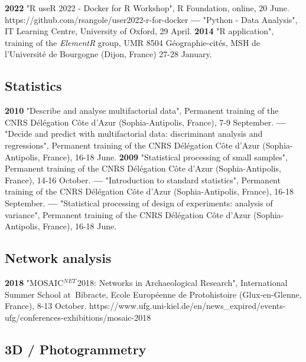\documentclass{article}
\begin{document}
\textbf{2022 }"\textsf{R} useR 2022 - Docker for R Workshop", R Foundation, online, 20 June. https://github.com/rsangole/user2022-r-for-docker
\smallbreak
\textbf{--- }"\textsf{Python} - Data Analysis", IT Learning Centre, University of Oxford, 29 April.
\smallbreak
\textbf{2014 }"\textsf{R} application", training of the \textit{ElementR} group, UMR 8504 G\'{e}ographie-cit\'{e}s, MSH de l'Universit\'{e} de Bourgogne (Dijon, France) 27-28 January.
\smallbreak

\subsection*{Statistics }

\textbf{2010 }"Describe and analyse multifactorial data", Permanent training of the CNRS D\'{e}l\'{e}gation C\^{o}te d'Azur (Sophia-Antipolis, France), 7-9 September.
\smallbreak
\textbf{--- }"Decide and predict with multifactorial data: discriminant analysis and regressions", Permanent training of the CNRS D\'{e}l\'{e}gation C\^{o}te d'Azur (Sophia-Antipolis, France), 16-18 June.
\smallbreak
\textbf{2009 }"Statistical processing of small samples", Permanent training of the CNRS D\'{e}l\'{e}gation C\^{o}te d'Azur (Sophia-Antipolis, France), 14-16 October.
\smallbreak
\textbf{--- }"Introduction to standard statistics", Permanent training of the CNRS D\'{e}l\'{e}gation C\^{o}te d'Azur (Sophia-Antipolis, France), 16-18 September.
\smallbreak
\textbf{--- }"Statistical processing of design of experiments: analysis of variance", Permanent training of the CNRS D\'{e}l\'{e}gation C\^{o}te d'Azur (Sophia-Antipolis, France), 16-18 June.
\smallbreak

\subsection*{Network analysis}

\textbf{2018 }"MOSAIC${}^{NET\ }$2018: Networks in Archaeological Research", International Summer School at~Bibracte, Ecole Europ\'{e}enne de Protohistoire (Glux-en-Glenne, France), 8-13 October. https://www.ufg.uni-kiel.de/en/news_expired/events-ufg/conferences-exhibitions/mosaic-2018

\subsection*{3D / Photogrammetry}
\end{document}
